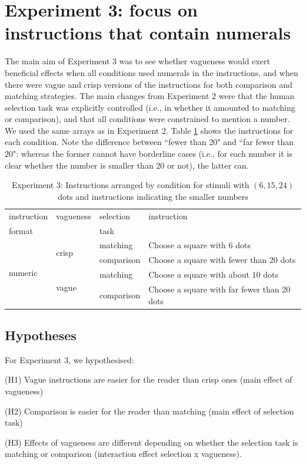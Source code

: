 \documentclass[%
man,		%
floatsintext,%
apacite%
]{apa6} %
\begin{document}
\section{Experiment 3: focus on instructions that contain numerals}

The main aim of Experiment 3 was to see whether vagueness would exert beneficial effects when all conditions used numerals in the instructions, and when there were vague and crisp versions of the instructions for both comparison and matching strategies. The main changes from Experiment 2 were that the human selection task was explicitly controlled (i.e., in whether it amounted to matching or comparison), and that all conditions were constrained to mention a number. We used the same arrays as in Experiment 2. Table \ref{Instructions for e3} shows the instructions for each condition. Note the difference between ``fewer than 20" and ``far fewer than 20": whereas the former cannot have borderline cases (i.e., for each number it is clear whether the number is smaller than 20 or not), the latter can.

\begin{table}[htbp]
\centering
\caption{Experiment 3: Instructions arranged by condition for stimuli with $(6,15,24)$ dots and instructions indicating the smaller numbers} 
\label{Instructions for e3}
\begin{tabular}{llll}
instruction					&vagueness					&	selection		&	instruction									\\
format						&							&	task			&												\\
\toprule
\multirow{4}{*}{numeric}	&\multirow{2}{*}{crisp} 	&	matching		& Choose a square with 6 dots 					\\ 
							&							&	comparison 		& Choose a square with fewer than 20 dots 		\\
\cline{2-4}
							&\multirow{2}{*}{vague} 	&	matching 		& Choose a square with about 10 dots 			\\ 
							&							&	comparison 		& Choose a square with far fewer than 20 dots 	\\ 
\bottomrule
\end{tabular}
\end{table}%

\subsection{Hypotheses} %
\noindent For Experiment 3, we hypothesised:
{\small
\begin{APAenumerate}
	\item [(H1)] Vague instructions are easier for the reader than crisp ones (main effect of vagueness)
	\item [(H2)] Comparison is easier for the reader than matching (main effect of selection task)
	\item [(H3)] Effects of vagueness are different depending on whether the selection task is matching or comparison (interaction effect selection x vagueness).
\end{APAenumerate}
}
\end{document}
